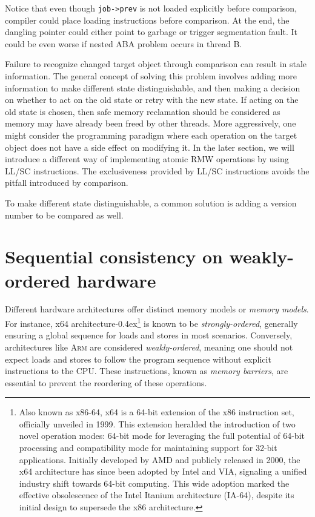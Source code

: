 \documentclass[fontsize=10pt, oneside]{scrartcl}
\newcommand{\punckern}{\kern-0.4ex}
\newcommand{\monobox}[1]{\mbox{\texttt{#1}}}
\newcommand{\introduce}[1]{\textit{#1}}
\begin{document}
Notice that even though \monobox{job->prev} is not loaded explicitly before comparison, compiler could place loading instructions before comparison.
At the end, the dangling pointer could either point to garbage or trigger segmentation fault.
It could be even worse if nested ABA problem occurs in thread B.

Failure to recognize changed target object through comparison can result in stale information.
The general concept of solving this problem involves adding more information to make different state distinguishable, and then making a decision on whether to act on the old state or retry with the new state.
If acting on the old state is chosen, then safe memory reclamation should be considered as memory may have already been freed by other threads.
More aggressively, one might consider the programming paradigm where each operation on the target object does not have a side effect on modifying it.
In the later section, we will introduce a different way of implementing atomic \textsc{RMW} operations by using LL/SC instructions. The exclusiveness provided by LL/SC instructions avoids the pitfall introduced by comparison.

To make different state distinguishable, a common solution is adding a version number to be compared as well.


\section{Sequential consistency on weakly-ordered hardware}

Different hardware architectures offer distinct memory models or \introduce{memory models}.
For instance, x64 architecture\punckern\footnote{%
Also known as x86-64, x64 is a 64-bit extension of the x86 instruction set, officially unveiled in 1999.
This extension heralded the introduction of two novel operation modes:
64-bit mode for leveraging the full potential of 64-bit processing and compatibility mode for maintaining support for 32-bit applications.
Initially developed by AMD and publicly released in 2000, the x64 architecture has since been adopted by Intel and VIA,
signaling a unified industry shift towards 64-bit computing.
This wide adoption marked the effective obsolescence of the Intel Itanium architecture (IA-64),
despite its initial design to supersede the x86 architecture.
} is known to be \introduce{strongly-ordered},
generally ensuring a global sequence for loads and stores in most scenarios.
Conversely, architectures like \textsc{Arm} are considered \introduce{weakly-ordered},
meaning one should not expect loads and stores to follow the program sequence without explicit instructions to the \textsc{CPU}.
These instructions, known as \introduce{memory barriers}, are essential to prevent the reordering of these operations.
\end{document}
